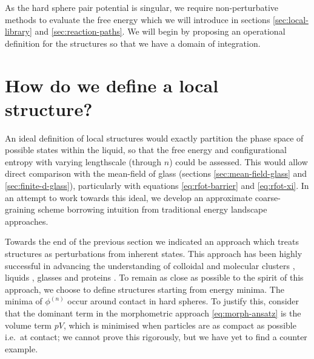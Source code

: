 \documentclass[11pt,twoside]{report}
\begin{document}
As the hard sphere pair potential is singular, we require non-perturbative methods to evaluate the free energy which we will introduce in sections \ref{sec:local-library} and \ref{sec:reaction-paths}.
We will begin by proposing an operational definition for the structures so that we have a domain of integration.

\section{How do we define a local structure?}
\label{sec:structure-definition}

An ideal definition of local structures would exactly partition the phase space of possible states within the liquid, so that the free energy and configurational entropy with varying lengthscale (through $n$) could be assessed.
This would allow direct comparison with the mean-field of glass (sections \ref{sec:mean-field-glass} and \ref{sec:finite-d-glass}), particularly with equations \eqref{eq:rfot-barrier} and \eqref{eq:rfot-xi}.
In an attempt to work towards this ideal, we develop an approximate coarse-graining scheme borrowing intuition from traditional energy landscape approaches.

Towards the end of the previous section we indicated an approach which treats structures as perturbations from inherent states.
This approach has been highly successful in advancing the understanding of colloidal and molecular clusters \cite{WalesJCP1994,DoyePRB2001}, liquids \cite{DoyeJCP1995,DoyeJPB1996,StillingerPRA1982}, glasses \cite{WalesN1998,StillingerS1995} and proteins \cite{Wales2004}.
To remain as close as possible to the spirit of this approach, we choose to define structures starting from energy minima.
The minima of $\phi^{(n)}$ occur around contact in hard spheres.
To justify this, consider that the dominant term in the morphometric approach \eqref{eq:morph-ansatz} is the volume term $pV$, which is minimised when particles are as compact as possible i.e.\ at contact; we cannot prove this rigorously, but we have yet to find a counter example.
\end{document}
